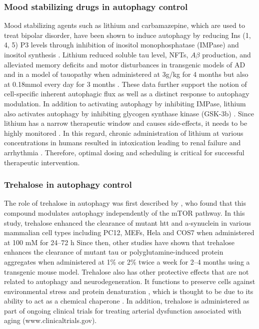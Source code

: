 \subsubsection{Mood stabilizing drugs in autophagy control}
Mood stabilizing agents such as lithium and carbamazepine, which are used to treat bipolar disorder, have been shown to induce autophagy by reducing Ins (1, 4, 5) P3 levels through inhibition of inositol monophosphatase (IMPase) and inositol synthesis \citep{Frake2015,sarkar2013}. Lithium reduced soluble tau level, NFTs, $A\beta$ production, and alleviated memory deficits and motor disturbances in transgenic models of AD and in a model of tauopathy when administered at 3g/kg for 4 months \citep{Shimada2012} but also at 0.18mmol every day for 3 months \citep{Zhang2011}. These data further support the notion of cell-specific inherent autophagic flux as well as a distinct response to autophagy modulation. In addition to activating autophagy by inhibiting IMPase, lithium also activates autophagy by inhibiting glycogen synthase kinase (GSK-3b) \citep{Gonzalez-Polo2015,sarkar2013,Sarkar2007}. Since lithium has a narrow therapeutic window and causes side-effects, it needs to be highly monitored \citep{Gonzalez-Polo2015}. In this regard, chronic administration of lithium at various concentrations in humans resulted in intoxication leading to renal failure and arrhythmia \citep{Chan2012,Gonzalez-Polo2015,Menegueti2012,Rej2012}. Therefore, optimal dosing and scheduling is critical for successful therapeutic intervention. 

\subsubsection{Trehalose in autophagy control}
The role of trehalose in autophagy was first described by \citet{Sarkar2007,Sarkar2007a}, who found that this compound modulates autophagy independently of the mTOR pathway. In this study, trehalose enhanced the clearance of mutant htt and a-synuclein in various mammalian cell types including PC12, MEFs, Hela and COS7 when administered at 100 mM for 24–72 h \citet{Sarkar2007,Sarkar2007a} Since then, other studies have shown that trehalose enhances the clearance of mutant tau \citep{Rodriguez-Navarro2010,Schaeffer2012} or polyglutamine-induced protein aggregates \citep{Tanaka2004} when administered at 1\% or 2\% twice a week for 2–4 months using a transgenic mouse model. Trehalose also has other protective effects that are not related to autophagy and neurodegeneration. It functions to preserve cells against environmental stress and protein denaturation \citep{Chen2004,Gonzalez-Polo2015}, which is thought to be due to its ability to act as a chemical chaperone \citep{Sarkar2007}. In addition, trehalose is administered as part of ongoing clinical trials for treating arterial dysfunction associated with aging (www.clinicaltrials.gov).

